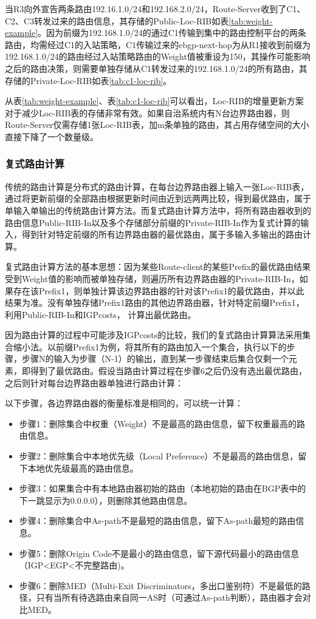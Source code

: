 当R3向外宣告两条路由192.16.1.0/24和192.168.2.0/24，Route-Server收到了C1、C2、C3转发过来的路由信息，其存储的Public-Loc-RIB如表\ref{tab:weight-example}。因为前缀为192.168.1.0/24的通过C1传输到集中的路由控制平台的两条路由，均需经过C1的入站策略，C1传输过来的ebgp-next-hop为从R1接收到前缀为192.168.1.0/24的路由经过入站策略路由的Weight值被重设为150，其操作可能影响之后的路由决策，则需要单独存储从C1转发过来的192.168.1.0/24的所有路由，其存储的Private-Loc-RIB如表\ref{tab:c1-loc-rib}。


从表\ref{tab:weight-example}、表\ref{tab:c1-loc-rib}可以看出，Loc-RIB的增量更新方案对于减少Loc-RIB表的存储非常有效。如果自治系统内有N台边界路由器，则Route-Server仅需存储1张Loc-RIB表，加m条单独的路由，其占用存储空间的大小直接下降了一个数量级。


\subsubsection{复式路由计算}

传统的路由计算是分布式的路由计算，在每台边界路由器上输入一张Loc-RIB表，通过将更新前缀的全部路由根据更新时间由近到远两两比较，得到最优路由，属于单输入单输出的传统路由计算方法。而复式路由计算方法中，将所有路由器收到的路由信息Public-RIB-In以及多个存储部分前缀的Private-RIB-In作为复式计算的输入，得到针对特定前缀的所有边界路由器的最优路由，属于多输入多输出的路由计算。

复式路由计算方法的基本思想：因为某些Route-client的某些Prefix的最优路由结果受到Weight值的影响而被单独存储，则遍历所有边界路由器的Private-RIB-In，如果存在该Prefix1，则单独计算该边界路由器的针对该Prefix1的最优路由，并以此结果为准。没有单独存储Prefix1路由的其他边界路由器，针对特定前缀Prefix1，利用Public-RIB-In和IGPcosts， 计算出最优路由。

因为路由计算的过程中可能涉及IGPcosts的比较，我们的复式路由计算算法采用集合缩小法。以前缀Prefix1为例，将其所有的路由加入一个集合，执行以下的步骤，步骤N的输入为步骤（N-1）的输出，直到某一步骤结束后集合仅剩一个元素，即得到了最优路由。假设当路由计算过程在步骤6之后仍没有选出最优路由，之后则针对每台边界路由器单独进行路由计算：

以下步骤，各边界路由器的衡量标准是相同的，可以统一计算：
\begin{itemize}
    \item 步骤1：删除集合中权重（Weight）不是最高的路由信息，留下权重最高的路由信息。
    \item 步骤2：删除集合中本地优先级（Local Preference）不是最高的路由信息，留下本地优先级最高的路由信息。
    \item 步骤3：如果集合中有本地路由器初始的路由（本地初始的路由在BGP表中的下一跳显示为0.0.0.0），则删除其他路由信息。
    \item 步骤4：删除集合中As-path不是最短的路由信息，留下As-path最短的路由信息。
    \item 步骤5：删除Origin Code不是最小的路由信息，留下源代码最小的路由信息（IGP<EGP<不完整路由)。
    \item 步骤6：删除MED（Multi-Exit Discriminators，多出口鉴别符）不是最低的路径，只有当所有待选路由来自同一AS时（可通过As-path判断），路由器才会对比MED。
\end{itemize}


